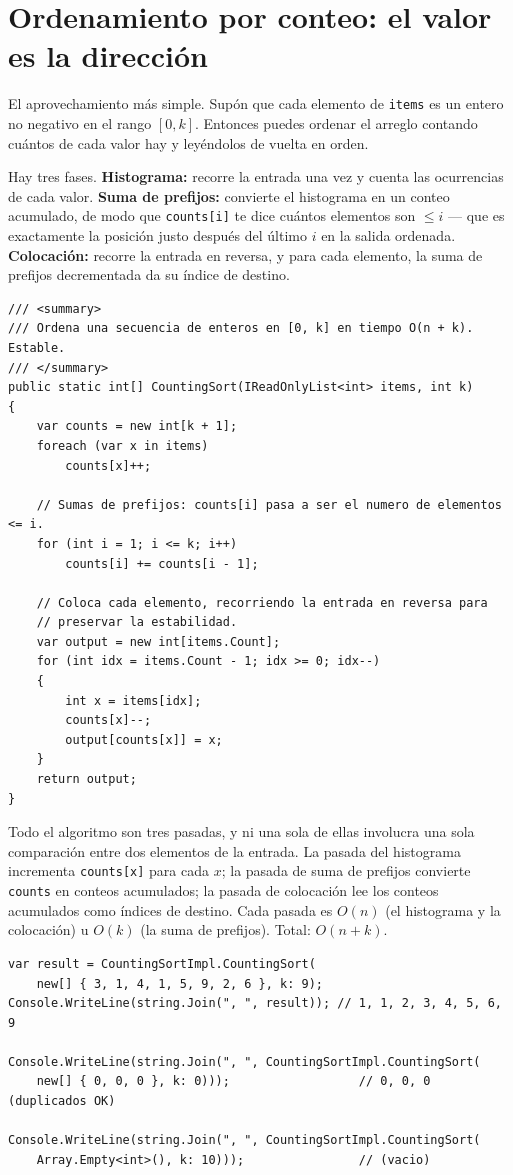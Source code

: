 \documentclass[11pt,a4paper]{article}
\begin{document}
\section{Ordenamiento por conteo: el valor es la dirección}

El aprovechamiento más simple. Supón que cada elemento de \texttt{items} es un entero no negativo en el rango $[0, k]$. Entonces puedes ordenar el arreglo contando cuántos de cada valor hay y leyéndolos de vuelta en orden.

Hay tres fases. \textbf{Histograma:} recorre la entrada una vez y cuenta las ocurrencias de cada valor. \textbf{Suma de prefijos:} convierte el histograma en un conteo acumulado, de modo que \texttt{counts[i]} te dice cuántos elementos son $\le i$ --- que es exactamente la posición justo después del último $i$ en la salida ordenada. \textbf{Colocación:} recorre la entrada en reversa, y para cada elemento, la suma de prefijos decrementada da su índice de destino.

\begin{lstlisting}[caption={Ordenamiento por conteo}]
/// <summary>
/// Ordena una secuencia de enteros en [0, k] en tiempo O(n + k). Estable.
/// </summary>
public static int[] CountingSort(IReadOnlyList<int> items, int k)
{
    var counts = new int[k + 1];
    foreach (var x in items)
        counts[x]++;

    // Sumas de prefijos: counts[i] pasa a ser el numero de elementos <= i.
    for (int i = 1; i <= k; i++)
        counts[i] += counts[i - 1];

    // Coloca cada elemento, recorriendo la entrada en reversa para
    // preservar la estabilidad.
    var output = new int[items.Count];
    for (int idx = items.Count - 1; idx >= 0; idx--)
    {
        int x = items[idx];
        counts[x]--;
        output[counts[x]] = x;
    }
    return output;
}
\end{lstlisting}

Todo el algoritmo son tres pasadas, y ni una sola de ellas involucra una sola comparación entre dos elementos de la entrada. La pasada del histograma incrementa \texttt{counts[x]} para cada $x$; la pasada de suma de prefijos convierte \texttt{counts} en conteos acumulados; la pasada de colocación lee los conteos acumulados como índices de destino. Cada pasada es $O(n)$ (el histograma y la colocación) u $O(k)$ (la suma de prefijos). Total: $O(n + k)$.

\begin{lstlisting}
var result = CountingSortImpl.CountingSort(
    new[] { 3, 1, 4, 1, 5, 9, 2, 6 }, k: 9);
Console.WriteLine(string.Join(", ", result)); // 1, 1, 2, 3, 4, 5, 6, 9

Console.WriteLine(string.Join(", ", CountingSortImpl.CountingSort(
    new[] { 0, 0, 0 }, k: 0)));                  // 0, 0, 0 (duplicados OK)

Console.WriteLine(string.Join(", ", CountingSortImpl.CountingSort(
    Array.Empty<int>(), k: 10)));                // (vacio)
\end{lstlisting}
\end{document}
